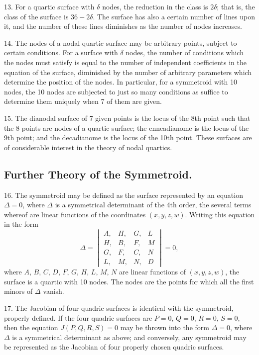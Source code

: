 \documentclass[11pt,a4paper]{article}
\begin{document}
13. For a quartic surface with $\delta$ nodes, the reduction in the class is $2\delta$; that is, the class of the surface is $36 - 2\delta$. The surface has also a certain number of lines upon it, and the number of these lines diminishes as the number of nodes increases.

14. The nodes of a nodal quartic surface may be arbitrary points, subject to certain conditions. For a surface with $\delta$ nodes, the number of conditions which the nodes must satisfy is equal to the number of independent coefficients in the equation of the surface, diminished by the number of arbitrary parameters which determine the position of the nodes. In particular, for a symmetroid with 10 nodes, the 10 nodes are subjected to just so many conditions as suffice to determine them uniquely when 7 of them are given.

15. The dianodal surface of 7 given points is the locus of the 8th point such that the 8 points are nodes of a quartic surface; the enneadianome is the locus of the 9th point; and the decadianome is the locus of the 10th point. These surfaces are of considerable interest in the theory of nodal quartics.

\subsection*{Further Theory of the Symmetroid.}

16. The symmetroid may be defined as the surface represented by an equation $\Delta = 0$, where $\Delta$ is a symmetrical determinant of the 4th order, the several terms whereof are linear functions of the coordinates $(x, y, z, w)$. Writing this equation in the form
\[
\Delta = \begin{vmatrix}
A, & H, & G, & L \\
H, & B, & F, & M \\
G, & F, & C, & N \\
L, & M, & N, & D
\end{vmatrix} = 0,
\]
where $A$, $B$, $C$, $D$, $F$, $G$, $H$, $L$, $M$, $N$ are linear functions of $(x, y, z, w)$, the surface is a quartic with 10 nodes. The nodes are the points for which all the first minors of $\Delta$ vanish.

17. The Jacobian of four quadric surfaces is identical with the symmetroid, properly defined. If the four quadric surfaces are $P = 0$, $Q = 0$, $R = 0$, $S = 0$, then the equation $J(P, Q, R, S) = 0$ may be thrown into the form $\Delta = 0$, where $\Delta$ is a symmetrical determinant as above; and conversely, any symmetroid may be represented as the Jacobian of four properly chosen quadric surfaces.
\end{document}
